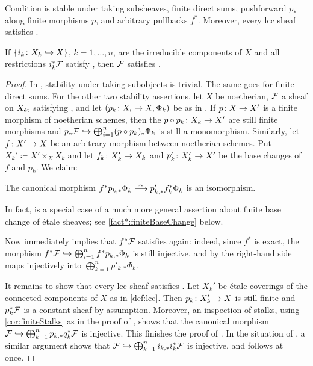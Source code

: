 \begin{fact}\label{fact:c2}
	\begin{alphanumerate}
		\item Condition  is stable under taking subsheaves, finite direct sums, pushforward $p_*$ along finite morphisms $p$, and arbitrary pullbacks $f^*$. Moreover, every lcc sheaf satisfies .
		\item If $\{i_k\colon X_k\monomorphism X\}$, $k=1,\dotsc,n$, are the irreducible components of $X$ and all restrictions $i_k^*\mathcal{F}$ satisfy , then $\mathcal{F}$ satisfies .
	\end{alphanumerate}
\end{fact}
\begin{proof}
	In , stability under taking subobjects is trivial. The same goes for finite direct sums. For the other two stability assertions, let $X$ be noetherian, $\mathcal{F}$ a sheaf on $X_{\mathrm{\acute{e}t}}$ satisfying , and let $(p_k\colon X_i\morphism X,\Phi_k)$ be as in . If $p\colon X\morphism X'$ is a finite morphism of noetherian schemes, then the $p\circ p_k\colon X_k\morphism X'$ are still finite morphisms and $p_*\Ff\monomorphism \bigoplus_{i=1}^n(p\circ p_k)_*\Phi_k$ is still a monomorphism. Similarly, let $f\colon X'\morphism X$ be an arbitrary morphism between noetherian schemes. Put $X_k'\coloneqq X'\times_XX_k$ and let $f_k\colon X_k'\morphism X_k$ and $p_k'\colon X_k'\morphism X'$ be the base changes of $f$ and $p_k$. We claim:
	\begin{alphanumerate}
		\item[\itememph{*}] The canonical morphism $f^*p_{k,*}\Phi_k\isomorphism p'_{k,*}f_k^*\Phi_k$ is an isomorphism.
	\end{alphanumerate}
	In fact, \itememph{*} is a special case of a much more general assertion about finite base change of étale sheaves; see \cref{fact*:finiteBaseChange} below.
	
	Now \itememph{*} immediately implies that $f^*\mathcal{F}$ satisfies  again: indeed, since $f^*$ is exact, the morphism $f^*\Ff\monomorphism\bigoplus_{i=1}^nf^*p_{k,*}\Phi_k$ is still injective, and by \itememph{*} the right-hand side maps injectively into $\bigoplus_{k=1}^np'_{k,*}\Phi_k$.
	
	It remains to show that every lcc sheaf satisfies . Let $X_k'$ be étale coverings of the connected components of $X$ as in \cref{def:lcc}. Then $p_k\colon X_k'\morphism X$ is still finite and $p_k^*\mathcal{F}$ is a constant sheaf by assumption. Moreover, an inspection of stalks, using \cref{cor:finiteStalks} as in the proof of \itememph{*}, shows that the canonical morphism $\Ff\monomorphism \bigoplus_{k=1}^np_{k,*}q_k^*\Ff$ is injective. This finishes the proof of . In the situation of , a similar argument shows that $\Ff\monomorphism\bigoplus_{k=1}^ni_{k,*}i_k^*\Ff$ is injective, and  follows at once.
\end{proof}
